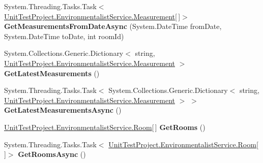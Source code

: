 \begin{DoxyCompactItemize}
\item 
\hypertarget{class_unit_test_project_1_1_environmentalist_service_1_1_service1_client_af0153749e058f88b76ca64a31b36898f}{}System.\+Threading.\+Tasks.\+Task$<$ \hyperlink{class_unit_test_project_1_1_environmentalist_service_1_1_measurement}{Unit\+Test\+Project.\+Environmentalist\+Service.\+Measurement}\mbox{[}$\,$\mbox{]}$>$ {\bfseries Get\+Measurements\+From\+Date\+Async} (System.\+Date\+Time from\+Date, System.\+Date\+Time to\+Date, int room\+Id)\label{class_unit_test_project_1_1_environmentalist_service_1_1_service1_client_af0153749e058f88b76ca64a31b36898f}

\item 
\hypertarget{class_unit_test_project_1_1_environmentalist_service_1_1_service1_client_a69b3edea25281cbc31f27f0e054114e4}{}System.\+Collections.\+Generic.\+Dictionary$<$ string, \hyperlink{class_unit_test_project_1_1_environmentalist_service_1_1_measurement}{Unit\+Test\+Project.\+Environmentalist\+Service.\+Measurement} $>$ {\bfseries Get\+Latest\+Measurements} ()\label{class_unit_test_project_1_1_environmentalist_service_1_1_service1_client_a69b3edea25281cbc31f27f0e054114e4}

\item 
\hypertarget{class_unit_test_project_1_1_environmentalist_service_1_1_service1_client_ad6b88dc9ded0c3fb7e141b018fae7030}{}System.\+Threading.\+Tasks.\+Task$<$ System.\+Collections.\+Generic.\+Dictionary$<$ string, \hyperlink{class_unit_test_project_1_1_environmentalist_service_1_1_measurement}{Unit\+Test\+Project.\+Environmentalist\+Service.\+Measurement} $>$ $>$ {\bfseries Get\+Latest\+Measurements\+Async} ()\label{class_unit_test_project_1_1_environmentalist_service_1_1_service1_client_ad6b88dc9ded0c3fb7e141b018fae7030}

\item 
\hypertarget{class_unit_test_project_1_1_environmentalist_service_1_1_service1_client_a5af12e6e887274899bdde51bd655dff7}{}\hyperlink{class_unit_test_project_1_1_environmentalist_service_1_1_room}{Unit\+Test\+Project.\+Environmentalist\+Service.\+Room}\mbox{[}$\,$\mbox{]} {\bfseries Get\+Rooms} ()\label{class_unit_test_project_1_1_environmentalist_service_1_1_service1_client_a5af12e6e887274899bdde51bd655dff7}

\item 
\hypertarget{class_unit_test_project_1_1_environmentalist_service_1_1_service1_client_ade2aaac7c70fad08d2c02b3fc023b104}{}System.\+Threading.\+Tasks.\+Task$<$ \hyperlink{class_unit_test_project_1_1_environmentalist_service_1_1_room}{Unit\+Test\+Project.\+Environmentalist\+Service.\+Room}\mbox{[}$\,$\mbox{]}$>$ {\bfseries Get\+Rooms\+Async} ()\label{class_unit_test_project_1_1_environmentalist_service_1_1_service1_client_ade2aaac7c70fad08d2c02b3fc023b104}


\end{DoxyCompactItemize}
